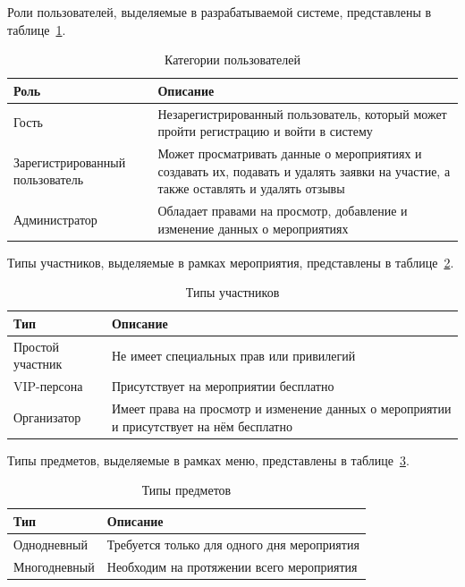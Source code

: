 Роли пользователей, выделяемые в разрабатываемой системе, представлены в таблице~\ref{tbl:user-roles}.

\begin{table}[h]
	\centering
	\caption{Категории пользователей}
	\begin{tabularx}{\textwidth}{|p{5cm}|X|}
		\hline
		\textbf{Роль} & \textbf{Описание} \\
		\hline
		Гость & Незарегистрированный пользователь, который может пройти регистрацию и войти в систему \\
		\hline
		Зарегистрированный пользователь & Может просматривать данные о мероприятиях и создавать их, подавать и удалять заявки на участие, а также оставлять и удалять отзывы \\
		\hline
		Администратор & Обладает правами на просмотр, добавление и изменение данных о мероприятиях \\
		\hline
	\end{tabularx}
	\label{tbl:user-roles}
\end{table}

Типы участников, выделяемые в рамках мероприятия, представлены в таблице~\ref{tbl:person-types}.

\begin{table}[h]
	\centering
	\caption{Типы участников}
	\begin{tabularx}{\textwidth}{|p{5cm}|X|}
		\hline
		\textbf{Тип} & \textbf{Описание} \\
		\hline
		Простой участник & Не имеет специальных прав или привилегий \\
		\hline
		VIP-персона & Присутствует на мероприятии бесплатно \\
		\hline
		Организатор & Имеет права на просмотр и изменение данных о мероприятии и присутствует на нём бесплатно \\
		\hline
	\end{tabularx}
	\label{tbl:person-types}
\end{table}

\newpage

Типы предметов, выделяемые в рамках меню, представлены в таблице~\ref{tbl:items-types}.

\begin{table}[h]
	\centering
	\caption{Типы предметов}
	\begin{tabularx}{\textwidth}{|p{5cm}|X|}
		\hline
		\textbf{Тип} & \textbf{Описание} \\
		\hline
		Однодневный & Требуется только для одного дня мероприятия \\
		\hline
		Многодневный & Необходим на протяжении всего мероприятия \\
		\hline
	\end{tabularx}
	\label{tbl:items-types}
\end{table}

